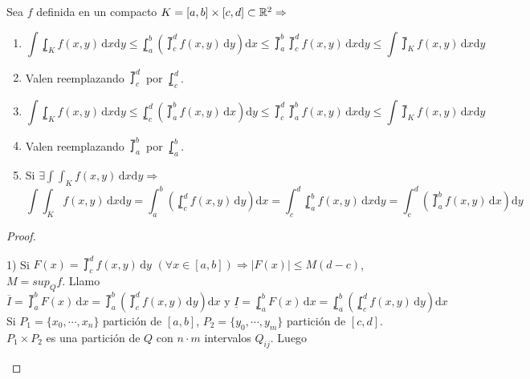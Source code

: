 \begin{theorem}
  Sea $f$ definida en un compacto $K = [a, b] \times [c, d] \subset \mathbb{R}^2 \Rightarrow$ \begin{enumerate}
    \item \begin{equation}
            \int \lowint_K f(x, y) \, \mathrm{d}x \mathrm{d}y \leq \lowint_a^b(\upint_c^d f(x, y)\, \mathrm{d}y)\mathrm{d}x \leq \upint_a^b \upint_c^d f(x, y) \, \mathrm{d}x \mathrm{d}y \leq \int \upint_K f(x, y) \, \mathrm{d}x \mathrm{d}y
          \end{equation}
    \item Valen reemplazando $\upint_c^d$ por $\lowint_c^d$.
    \item \begin{equation}
            \int \lowint_K f(x, y) \, \mathrm{d}x \mathrm{d}y \leq \lowint_c^d ( \upint_a^b f(x, y)\, \mathrm{d}x ) \mathrm{d}y \leq \upint_c^d \upint_a^b f(x, y) \, \mathrm{d}x \mathrm{d}y \leq \int \upint_K f(x, y) \, \mathrm{d}x \mathrm{d}y
          \end{equation}
    \item Valen reemplazando $\upint_a^b$ por $\lowint_a^b$.
    \item Si $\exists \int \int_K f(x, y) \, \mathrm{d}x \mathrm{d}y \Rightarrow$ \begin{equation}
            \int \int_K f(x, y) \, \mathrm{d}x \mathrm{d}y = \int_a^b(\lowint_c^d f(x, y) \, \mathrm{d}y)\mathrm{d}x = \int_c^d \lowint_a^b f(x, y) \, \mathrm{d}x \mathrm{d}y = \int_c^d(\upint_a^b f(x,y) \, \mathrm{d}x)\mathrm{d}y
          \end{equation}
  \end{enumerate}
  \begin{proof}
    \begin{enumerate}
      1) Si $F(x) = \upint_c^d f(x, y) \, \mathrm{d}y$ $(\forall x \in [a, b]) \Rightarrow |F(x)| \leq M (d - c)$, $M = sup_Q f$. Llamo \begin{equation}
        \overline{I} = \upint_a^b F(x)\, \mathrm{d}x = \upint_a^b(\upint_c^d f(x, y)\, \mathrm{d}y) \mathrm{d}x \text{ y }
        \underline{I} = \lowint_a^b F(x)\, \mathrm{d}x = \lowint_a^b( \lowint_c^d f(x, y)\, \mathrm{d}y) \mathrm{d}x
      \end{equation} Si $P_1 = \{x_0, \cdots, x_n\}$ partición de $[a, b]$, $P_2 = \{ y_0, \cdots, y_m \}$ partición de $[c, d]$. $P_1 \times P_2$ es una partición de $Q$ con $n \cdot m$ intervalos $Q_{ij}$. Luego \begin{equation}

\end{equation}
\end{enumerate}
\end{proof}
\end{theorem}
